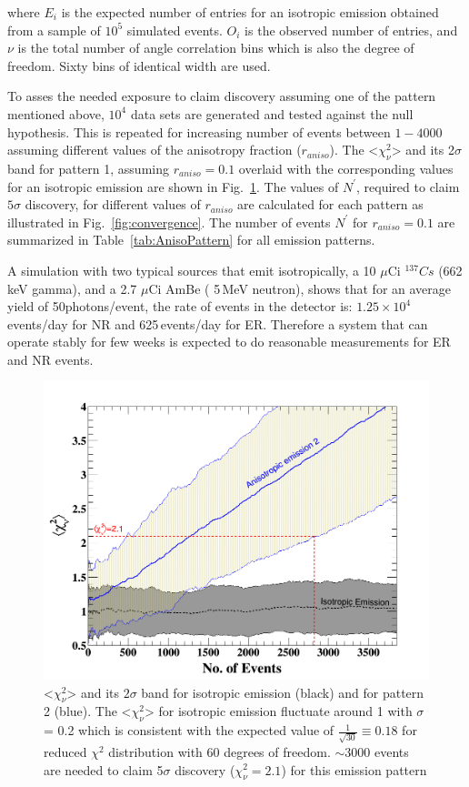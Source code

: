 where $E_i$ is the expected number of entries for an isotropic emission obtained from a sample of $10^5$ simulated events. 
$O_i$ is the observed number of entries, and $\nu$ is the total number of angle correlation bins 
which is also the degree of freedom. Sixty bins of identical width are used.


To asses the needed exposure to claim discovery assuming one of the   pattern mentioned above, $10^4$ data sets are generated and tested against the null hypothesis. This is repeated for increasing number of events between $1-4000$ assuming different values of the anisotropy fraction ($r_{aniso}$). The <$\chi^2_\nu$> 
and its 2$\sigma$ band for pattern 1, assuming $r_{aniso} =0.1$ overlaid with the corresponding values  for an isotropic emission are shown in Fig.~\ref{fig:pattern1}.  
The values of $N^{'}$, required to claim $5\sigma$ discovery, for different values of $r_{aniso}$ are calculated for each pattern as illustrated in Fig.~\ref{fig:convergence}.
The number of events 
$N^{'}$ for $r_{aniso} =0.1$ are summarized in Table~\ref{tab:AnisoPattern} for all emission patterns.

A simulation with two typical sources that emit isotropically, a 10 $\mu$Ci $^{137}Cs$ (662\,keV gamma), and a 2.7 $\mu$Ci AmBe ( 5\,MeV neutron), shows that for an average yield of 
50photons/event,  the rate of events in the detector is: $1.25\times10^{4}$\,events/day for NR and 625\,events/day for ER. 
Therefore a system that can operate stably for few weeks 
is expected to do reasonable measurements for ER and NR events.


\begin{figure}[h]
\centerline{\includegraphics[width=0.5\linewidth]{Pattern1.png}}
\caption{<$\chi^2_\nu$> and its $2\sigma$ band for isotropic emission (black) and for pattern 2 (blue). The <$\chi^2_\nu$> for 
isotropic emission fluctuate around 1 with $\sigma$ = 0.2 which is consistent with 
the expected value of $\frac{1}{\sqrt{30}} \equiv 0.18$ for reduced $\chi^2$ distribution 
with 60 degrees of freedom. $\sim3000$ events are needed to claim  5$\sigma$ discovery ($\chi^2_\nu=2.1$) for this emission pattern}
\label{fig:pattern1}
\end{figure}

